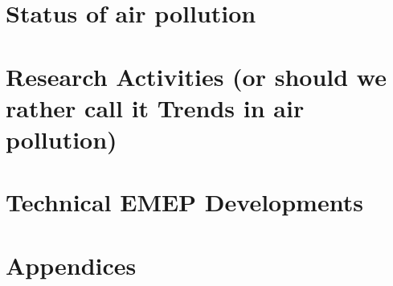\documentclass[a4paper,12pt,american,draft]{book}
\begin{document}
\frontmatter 
\pagestyle{fancy}


\cleardoublepage


\tableofcontents
\cleardoublepage

\mainmatter
\pagestyle{fancy}


\part{Status of air pollution}
 
% 

\part{Research Activities (or should we rather call it Trends in air pollution)} 


\part{Technical EMEP Developments}
%
%

\part{Appendices}
\setcounter{part}{1}
\cleardoublepage
\setcounter{page}{1}
\begin{appendix}
\renewcommand{\theHchapter}{\Alph{chapter}}
\renewcommand{\thepage}{{\em page \Alph{chapter}:\arabic{page}}}
\renewcommand{\thepage}{{\Alph{chapter}:\arabic{page}}}
\renewcommand{\thetable}{\Alph{chapter}:\arabic{table}}


%

%
%


\end{appendix}
\end{document}
